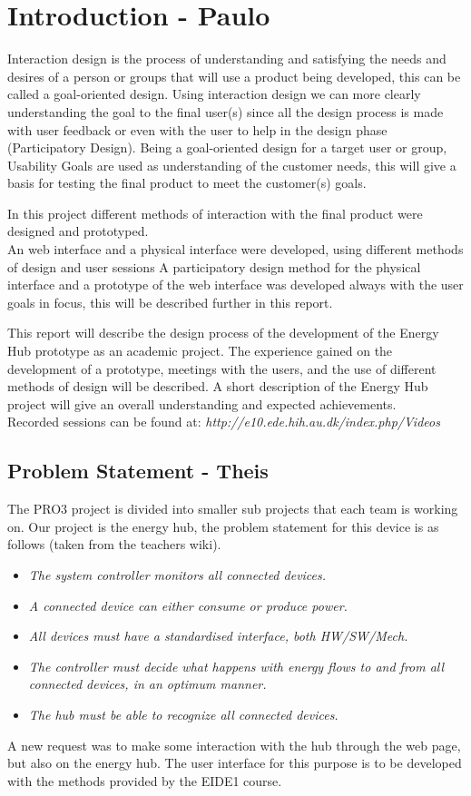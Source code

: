 \chapter{Introduction - Paulo}

Interaction design is the process of understanding and satisfying the needs and desires of a person or groups that will use a product being developed, this can be called a goal-oriented design. Using interaction design we can more clearly understanding the goal to the final user(s) since all the design process is made with user feedback or even with the user to help in the design phase (Participatory Design). Being a goal-oriented design for a target user or group, Usability Goals are used as understanding of the customer needs, this will give a basis for testing the final product to meet the customer(s) goals.

In this project different methods of interaction with the final product were designed and prototyped.\\
An web interface and a physical interface were developed, using different methods of design and user sessions A participatory design method for the physical interface and a prototype of the web interface was developed always with the user goals in focus, this will be described further in this report.

This report will describe the design process of the development of the Energy Hub prototype as an academic project. The experience gained on the development of a prototype, meetings with the users, and the use of different methods of design will be described. A short description of the Energy Hub project will give an overall understanding and expected achievements.\\

Recorded sessions can be found at: \textit{http://e10.ede.hih.au.dk/index.php/Videos}
\section{Problem Statement - Theis}
The PRO3 project is divided into smaller sub projects that each team is working on. Our project is the energy hub, the problem statement for this device is as follows (taken from the teachers wiki).
\begin{itemize}
	\item\textit{The system controller monitors all connected devices.}
	\item\textit{A connected device can either consume or produce power.}
	\item\textit{All devices must have a standardised interface, both HW/SW/Mech.}
	\item\textit{The controller must decide what happens with energy flows to and from all connected devices, in an optimum manner.}
	\item\textit{The hub must be able to recognize all connected devices.}
\end{itemize}
A new request was to make some interaction with the hub through the web page, but also on the energy hub. The user interface for this purpose is to be developed with the methods provided by the EIDE1 course.


